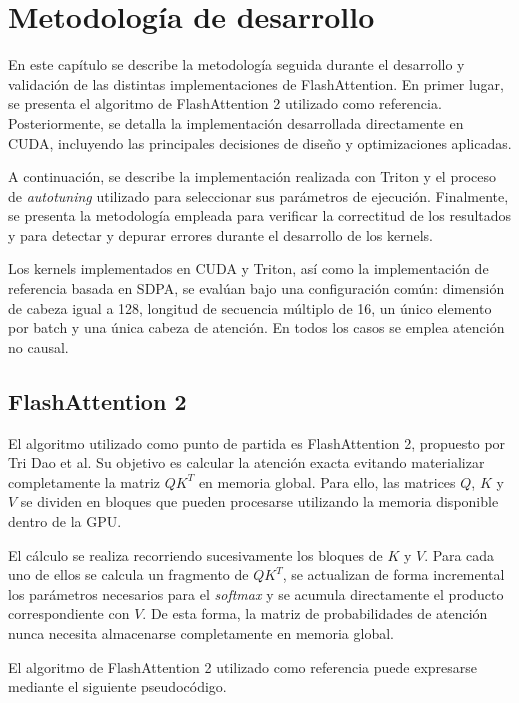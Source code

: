 \chapter{Metodología de desarrollo}

En este capítulo se describe la metodología seguida durante el desarrollo y validación de las distintas implementaciones de FlashAttention. En primer lugar, se presenta el algoritmo de FlashAttention 2 utilizado como referencia. Posteriormente, se detalla la implementación desarrollada directamente en CUDA, incluyendo las principales decisiones de diseño y optimizaciones aplicadas.

A continuación, se describe la implementación realizada con Triton y el proceso de \textit{autotuning} utilizado para seleccionar sus parámetros de ejecución. Finalmente, se presenta la metodología empleada para verificar la correctitud de los resultados y para detectar y depurar errores durante el desarrollo de los kernels.

Los kernels implementados en CUDA y Triton, así como la implementación de referencia basada en SDPA, se evalúan bajo una configuración común: dimensión de cabeza igual a 128, longitud de secuencia múltiplo de 16, un único elemento por batch y una única cabeza de atención. En todos los casos se emplea atención no causal.


\section{FlashAttention 2}

El algoritmo utilizado como punto de partida es FlashAttention 2, propuesto por Tri Dao et al. Su objetivo es calcular la atención exacta evitando materializar completamente la matriz \(QK^T\) en memoria global. Para ello, las matrices \(Q\), \(K\) y \(V\) se dividen en bloques que pueden procesarse utilizando la memoria disponible dentro de la GPU.

El cálculo se realiza recorriendo sucesivamente los bloques de \(K\) y \(V\). Para cada uno de ellos se calcula un fragmento de \(QK^T\), se actualizan de forma incremental los parámetros necesarios para el \textit{softmax} y se acumula directamente el producto correspondiente con \(V\). De esta forma, la matriz de probabilidades de atención nunca necesita almacenarse completamente en memoria global.

El algoritmo de FlashAttention 2 utilizado como referencia puede expresarse mediante el siguiente pseudocódigo.

